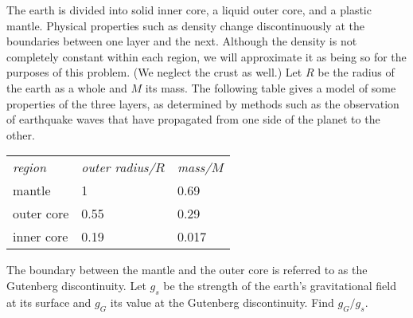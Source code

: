 The earth is divided into solid inner core, a liquid outer core, and a plastic mantle.
Physical properties such as density change discontinuously at the boundaries between
one layer and the next. Although the density is not completely constant within each
region, we will approximate it as being so for the purposes of this problem. 
(We neglect the crust as well.) Let $R$
be the radius of the earth as a whole and $M$ its mass. The
following table gives a model of some properties of the three layers, as determined
by methods such as the observation of earthquake waves that have propagated from one
side of the planet to the other.

\begin{tabular}{lll}
\emph{region} & \emph{outer radius/$R$} & \emph{mass/$M$} \\
mantle &        1                       & 0.69 \\
outer core &    0.55                    & 0.29 \\
inner core &    0.19                    & 0.017
\end{tabular}

The boundary between the mantle and the outer core is referred to as the
Gutenberg discontinuity. Let $g_s$ be the strength of the earth's gravitational
field at its surface and $g_G$ its value at the Gutenberg discontinuity.
Find $g_G/g_s$.\answercheck
